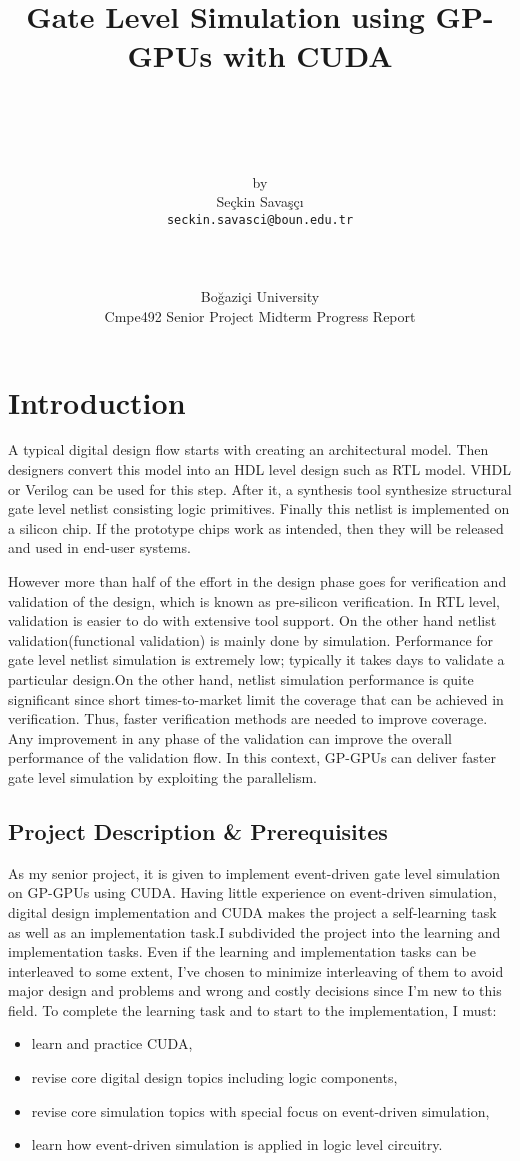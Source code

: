 \documentclass[12pt]{report}
\title{Gate Level Simulation using GP-GPUs with CUDA}
\author{
		\\
		\\
		\\
		\\
		by\\ 
		Se\c{c}kin Sava\c{s}\c{c}\i \\
		\texttt{seckin.savasci@boun.edu.tr}\\
		\\
		\\
		\\
		Bo\u{g}azi\c{c}i University \\
		Cmpe492 Senior Project Midterm Progress Report
		}
\begin{document}
\maketitle
\tableofcontents
\newpage

 \section{Introduction}
 
 A typical digital design flow starts with creating an architectural model. Then designers convert this model into an HDL level design such as RTL model. VHDL or Verilog can be used for this step. After it, a synthesis tool synthesize structural gate level netlist consisting logic primitives. Finally this netlist is implemented on a silicon chip. If the prototype chips work as intended, then they will be released and used in end-user systems.
 
  
 However more than half of the effort in the design phase goes for verification and validation of the design, which is known as pre-silicon verification. In RTL level, validation is easier to do with extensive tool support. On the other hand netlist validation(functional validation) is mainly done by simulation. Performance for gate level netlist simulation is extremely low; typically it takes days to validate a particular design.On the other hand, netlist simulation performance is quite significant since short times-to-market limit the coverage that can be achieved in verification. Thus, faster verification methods are needed to improve coverage. Any improvement in any phase of the validation can improve the overall performance of the validation flow. In this context, GP-GPUs can deliver faster gate level simulation by exploiting the parallelism. 
 
 \subsection{Project Description \& Prerequisites}
 
 As my senior project, it is given to implement event-driven gate level simulation on GP-GPUs using CUDA. Having little experience on event-driven simulation, digital design implementation and CUDA makes the project a self-learning task as well as an implementation task.I subdivided the project into the learning and implementation tasks. Even if the learning and implementation tasks can be interleaved to some extent, I've chosen to minimize interleaving of them to avoid major design and problems and wrong and costly decisions since I'm new to this field. To complete the learning task and to start to the implementation, I must:
 \begin{itemize}
 \item learn and practice CUDA, 
 \item revise core digital design topics including logic components,
 \item revise core simulation topics with special focus on event-driven simulation,
 \item learn how event-driven simulation is applied in logic level circuitry. 
 \end{itemize} 
 
\end{document}

